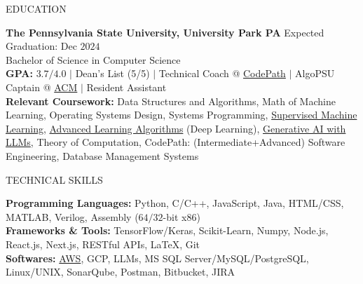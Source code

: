 \documentclass{resume} %
\begin{document}

\begin{rSection}{EDUCATION}

{\bf The Pennsylvania State University, University Park PA} \hfill {Expected Graduation: Dec $2024$}\\
{Bachelor of Science in Computer Science}\\
{\bf GPA:} $3.7/4.0$ $\vert$ Dean's List (5/5) $\vert$ Technical Coach @ \href{https://www.codepath.org/en-us/volunteers/technical-interview-coaching}{CodePath} $\vert$ AlgoPSU Captain @ \href{https://acm.psu.edu/algopsu/}{ACM} $\vert$ Resident Assistant\\
{\bf Relevant Coursework:} Data Structures and Algorithms, Math of Machine Learning, Operating Systems Design, Systems Programming, \href{https://www.coursera.org/account/accomplishments/verify/JYX5UB5YP4YD}{Supervised Machine Learning}, \href{https://www.coursera.org/account/accomplishments/records/PBF4QN2KQL4Z}{Advanced Learning Algorithms} (Deep Learning), \href{https://www.coursera.org/account/accomplishments/verify/3W6HA4ZC7UTY}{Generative AI with LLMs}, Theory of Computation, CodePath: (Intermediate+Advanced) Software Engineering, Database Management Systems
\end{rSection}


\begin{rSection}{TECHNICAL SKILLS}

{\bf Programming Languages:} Python, C/C++, JavaScript, Java, HTML/CSS, MATLAB, Verilog, Assembly ($64/32$-bit x$86$)\\
{\bf Frameworks \& Tools:} TensorFlow/Keras, Scikit-Learn, Numpy, Node.js, React.js, Next.js, RESTful APIs, \LaTeX, Git\\
{\bf Softwares:} \href{https://www.coursera.org/account/accomplishments/verify/7L8L8YQTMCPZ}{AWS}, GCP, LLMs, MS SQL Server/MySQL/PostgreSQL, Linux/UNIX, SonarQube, Postman, Bitbucket, JIRA

\end{rSection}
\end{document}
